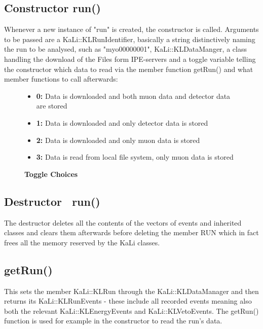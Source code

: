     \subsection{Constructor run()}
    \label{ch:Analysis software:sec:methods of the class run:subsec:Constructor}
    Whenever a new instance of "run" is created, the constructor is called. Arguments to be passed are a KaLi::KLRunIdentifier, basically a string distinctively naming the run to be analysed, such as "myo00000001", KaLi::KLDataManger, a class handling the download of the Files form IPE-servers and a toggle variable telling the constructor which data to read via the member function getRun() and what member functions to call afterwards:
    \begin{figure}
    \caption*{\bf Toggle Choices}
    	\begin{itemize}
    		\item {\bf 0:} Data is downloaded and both muon data and detector data are stored
    		\item {\bf 1:} Data is downloaded and only detector data is stored
    		\item {\bf 2:} Data is downloaded and only muon data is stored
    		\item {\bf 3:} Data is read from local file system, only muon data is stored
    	\end{itemize}
    \end{figure}
    
    \subsection{Destructor ~run()}
    \label{ch:Analysis software:sec:methods of the class run:subsec:destructor}
    The destructor deletes all the contents of the vectors of events and inherited classes and clears them afterwards before deleting the member RUN which in fact frees all the memory reserved by the KaLi classes.
    
    \subsection{getRun()}
    \label{ch:Analysis software:sec:methods of the class run:subsec:getRun()}
    
    This sets the member KaLi::KLRun through the KaLi::KLDataManager and then returns its KaLi::KLRunEvents - these include all recorded events meaning also both the relevant KaLi::KLEnergyEvents and KaLi::KLVetoEvents. The getRun() function is used for example in the constructor to read the run's data.
    
